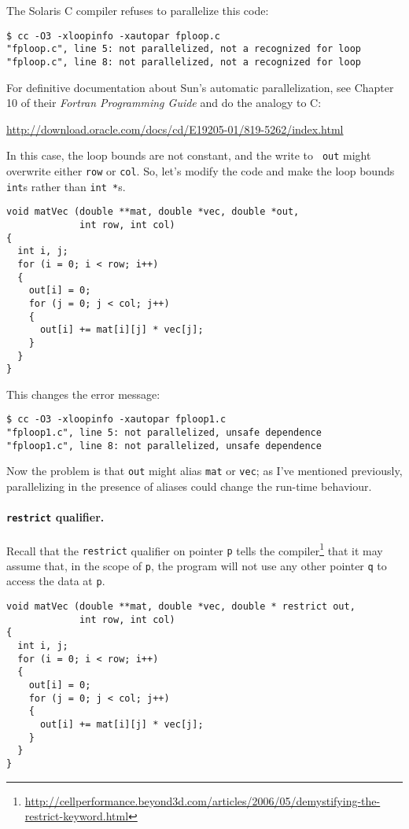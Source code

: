 The Solaris C compiler refuses to parallelize this code:
{\small 
\begin{verbatim}
$ cc -O3 -xloopinfo -xautopar fploop.c 
"fploop.c", line 5: not parallelized, not a recognized for loop
"fploop.c", line 8: not parallelized, not a recognized for loop
\end{verbatim} 
}
For definitive documentation about Sun's automatic parallelization, see
Chapter 10 of their \emph{Fortran Programming Guide} and do the analogy to C:

\url{http://download.oracle.com/docs/cd/E19205-01/819-5262/index.html}

In this case, the loop bounds are not constant, and the write to {\tt
  out} might overwrite either {\tt row} or {\tt col}. So, let's modify
the code and make the loop bounds {\tt int}s rather than {\tt int *}s.

\begin{verbatim}
void matVec (double **mat, double *vec, double *out,
             int row, int col) 
{
  int i, j;
  for (i = 0; i < row; i++)
  {
    out[i] = 0;
    for (j = 0; j < col; j++)
    {
      out[i] += mat[i][j] * vec[j];
    }
  }
}
\end{verbatim}
 This changes the error message:


\begin{verbatim}
$ cc -O3 -xloopinfo -xautopar fploop1.c 
"fploop1.c", line 5: not parallelized, unsafe dependence
"fploop1.c", line 8: not parallelized, unsafe dependence
\end{verbatim} 

Now the problem is that {\tt out} might alias {\tt mat} or {\tt vec};
as I've mentioned previously, parallelizing
in the presence of aliases could change the run-time behaviour.

\paragraph{{\tt restrict} qualifier.} 
Recall that the {\tt restrict} qualifier on pointer {\tt p} tells
the compiler\footnote{\url{http://cellperformance.beyond3d.com/articles/2006/05/demystifying-the-restrict-keyword.html}} that it may assume that, in the scope of {\tt p},
the program will not use any other pointer {\tt q} to access the
data at {\tt *p}.

{
\begin{verbatim}
void matVec (double **mat, double *vec, double * restrict out,
             int row, int col) 
{
  int i, j;
  for (i = 0; i < row; i++)
  {
    out[i] = 0;
    for (j = 0; j < col; j++)
    {
      out[i] += mat[i][j] * vec[j];
    }
  }
}
\end{verbatim}
}

